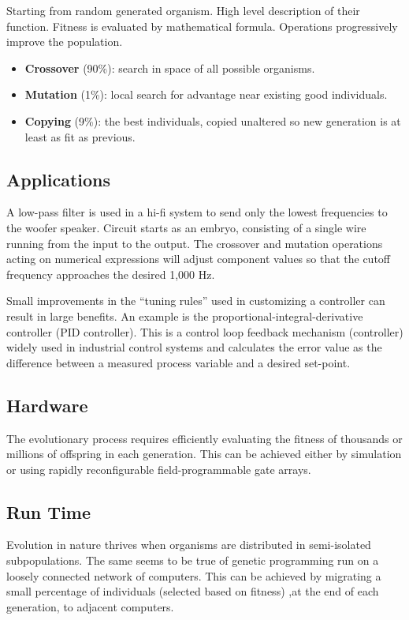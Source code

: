 \documentclass[../main.tex]{subfiles}
\begin{document}
Starting from random generated organism. High level description of their function. Fitness is evaluated by mathematical formula. Operations progressively improve the population.

\begin{itemize}
	\item \textbf{Crossover} (90\%): search in space of all possible organisms.
	\item \textbf{Mutation} (1\%): local search for advantage near existing good individuals.
	\item \textbf{Copying} (9\%): the best individuals, copied unaltered so new generation is at least as fit as
	previous.
\end{itemize}

\subsection{Applications}

\begin{ex}
A low-pass filter is used in a hi-fi system to send only the lowest frequencies to the woofer speaker. Circuit starts
as an embryo, consisting of a single wire running from the input to the output. The crossover and mutation operations
acting on numerical expressions will adjust component values so that the cutoff frequency approaches the desired 1,000
Hz.
\end{ex}

\begin{ex}
Small improvements in the ``tuning rules'' used in customizing a controller can result in large benefits. An example is
the proportional-integral-derivative controller (PID controller). This is a control loop feedback mechanism
(controller) widely used in industrial control systems and calculates  the error value as the difference between a
measured process variable and a desired set-point.
\end{ex}

\subsection{Hardware}
The evolutionary process requires efficiently evaluating the fitness of thousands or millions of offspring in each
generation. This can be achieved either by simulation or using rapidly reconfigurable field-programmable gate arrays.

\subsection{Run Time}
Evolution in nature thrives when organisms are distributed in semi-isolated subpopulations. The same seems to be true
of genetic programming run on a loosely connected network of computers. This can be achieved by migrating a small
percentage of individuals (selected based on fitness) ,at the end of each generation, to adjacent computers.
\end{document}
